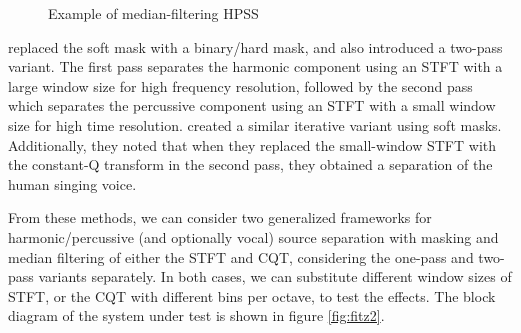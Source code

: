 \documentclass[letter,12pt]{article}
\begin{document}
\begin{figure}[ht]
	\centering
	\caption{Example of median-filtering HPSS}
	\label{fig:fitz1}
\end{figure}

\citet{driedger} replaced the soft mask with a binary/hard mask, and also introduced a two-pass variant. The first pass separates the harmonic component using an STFT with a large window size for high frequency resolution, followed by the second pass which separates the percussive component using an STFT with a small window size for high time resolution. \citet{fitzgerald2} created a similar iterative variant using soft masks. Additionally, they noted that when they replaced the small-window STFT with the constant-Q transform in the second pass, they obtained a separation of the human singing voice.

From these methods, we can consider two generalized frameworks for harmonic/percussive (and optionally vocal) source separation with masking and median filtering of either the STFT and CQT, considering the one-pass and two-pass variants separately. In both cases, we can substitute different window sizes of STFT, or the CQT with different bins per octave, to test the effects. The block diagram of the system under test is shown in figure \ref{fig:fitz2}.
\end{document}
